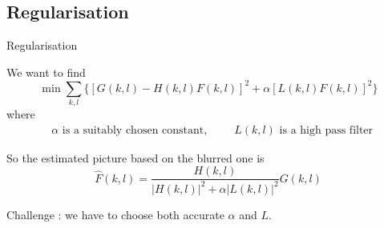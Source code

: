 \subsection{Regularisation}
\begin{frame}{Regularisation}

We want to find 
\begin{equation*}
\min \sum_{k,l} \{ [G(k,l) - H(k,l)F(k,l)]^2 + \alpha [L(k,l)F(k,l)]^2\}
\end{equation*}
where 
\begin{align*}
\text{ $\alpha$ is a suitably chosen constant}, & & \text{ $L(k,l)$ is a high pass filter}
\end{align*}

So the estimated picture based on the blurred one is
\begin{equation*}
\hat{F}(k,l) = \frac{H(k,l)}{|H(k,l)|^2 + \alpha |L(k,l)|^2} G(k,l)
\end{equation*}

Challenge :  we have to choose both accurate $\alpha$ and $L$.
\end{frame}
